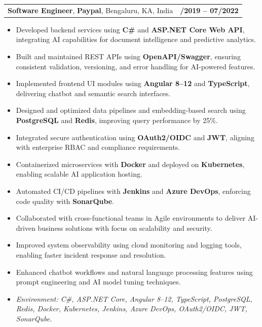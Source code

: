 \documentclass[letterpaper,11pt]{article}
\makeatletter
\newcommand{\resumeItem}[1]{
  \item\footnotesize{
    {#1 \vspace{-2pt}}
  }
}
\newcommand{\resumeSubheading}[4]{
  \vspace{-2pt}\item
    \begin{tabular*}{1.0\textwidth}[t]{l@{\extracolsep{\fill}}r}
      \textbf{\fontsize{10pt}{14pt}\selectfont #3}, \textbf{\fontsize{10pt}{14pt}\selectfont #1}, \fontsize{10pt}{14pt}\selectfont #4 & \textbf{\fontsize{10pt}{14pt}\selectfont #2} \\
    \end{tabular*}\vspace{-7pt}
}
\newcommand{\resumeItemListStart}{\begin{itemize}[leftmargin=*]}
\newcommand{\resumeItemListEnd}{\end{itemize}\vspace{-5pt}}
\makeatother
\begin{document}
\resumeSubheading
{Paypal}{08/2019 -- 07/2022}
{Software Engineer}{Bengaluru, KA, India}
\resumeItemListStart
  \resumeItem{Developed backend services using \textbf{C\#} and \textbf{ASP.NET Core Web API}, integrating AI capabilities for document intelligence and predictive analytics.}
  \resumeItem{Built and maintained REST APIs using \textbf{OpenAPI/Swagger}, ensuring consistent validation, versioning, and error handling for AI-powered features.}
  \resumeItem{Implemented frontend UI modules using \textbf{Angular 8--12} and \textbf{TypeScript}, delivering chatbot and semantic search interfaces.}
  \resumeItem{Designed and optimized data pipelines and embedding-based search using \textbf{PostgreSQL} and \textbf{Redis}, improving query performance by 25\%.}
  \resumeItem{Integrated secure authentication using \textbf{OAuth2/OIDC} and \textbf{JWT}, aligning with enterprise RBAC and compliance requirements.}
  \resumeItem{Containerized microservices with \textbf{Docker} and deployed on \textbf{Kubernetes}, enabling scalable AI application hosting.}
  \resumeItem{Automated CI/CD pipelines with \textbf{Jenkins} and \textbf{Azure DevOps}, enforcing code quality with \textbf{SonarQube}.}
  \resumeItem{Collaborated with cross-functional teams in Agile environments to deliver AI-driven business solutions with focus on scalability and security.}
  \resumeItem{Improved system observability using cloud monitoring and logging tools, enabling faster incident response and resolution.}
  \resumeItem{Enhanced chatbot workflows and natural language processing features using prompt engineering and AI model tuning techniques.}
  \resumeItem{\textit{Environment: C\#, ASP.NET Core, Angular 8--12, TypeScript, PostgreSQL, Redis, Docker, Kubernetes, Jenkins, Azure DevOps, OAuth2/OIDC, JWT, SonarQube.}}
\resumeItemListEnd
\end{document}
